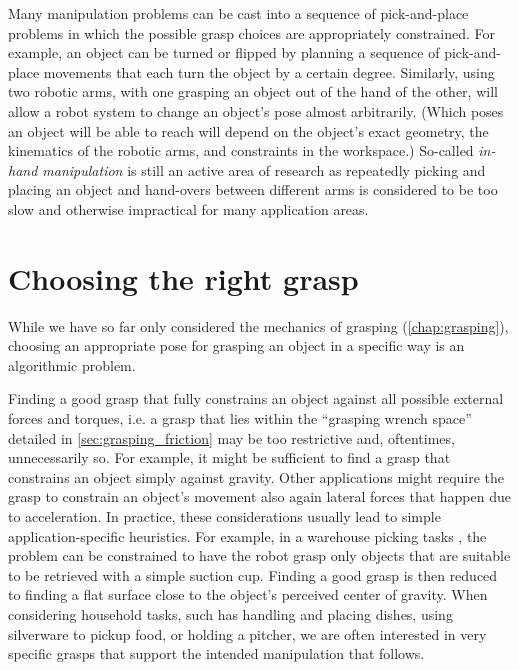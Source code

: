 Many manipulation problems can be cast into a sequence of pick-and-place problems in which the possible grasp choices are appropriately constrained. For example, an object can be turned or flipped by planning a sequence of pick-and-place movements that each turn the object by a certain degree. Similarly, using two robotic arms, with one grasping an object out of the hand of the other, will allow a robot system to change an object's pose almost arbitrarily. (Which poses an object will be able to reach will depend on the object's exact geometry, the kinematics of the robotic arms, and constraints in the workspace.) So-called \textsl{in-hand manipulation} is still an active area of research as repeatedly picking and placing an object and hand-overs between different arms is considered to be too slow and otherwise impractical for many application areas.


\section{Choosing the right grasp}
While we have so far only considered the mechanics of grasping (\cref{chap:grasping}), choosing an appropriate pose for grasping an object in a specific way is an algorithmic problem.

Finding a good grasp that fully constrains an object against all possible external forces and torques, i.e. a grasp that lies within the ``grasping wrench space'' detailed in \cref{sec:grasping_friction} may be too restrictive and, oftentimes, unnecessarily so.
For example, it might be sufficient to find a grasp that constrains an object simply against gravity.
Other applications might require the grasp to constrain an object's movement also again lateral forces that happen due to acceleration.
In practice, these considerations usually lead to simple application-specific heuristics. For example, in a warehouse picking tasks \cite{correll2016analysis}, the problem can be constrained to have the robot grasp only objects that are suitable to be retrieved with a simple suction cup. Finding a good grasp is then reduced to finding a flat surface close to the object's perceived center of gravity.
When considering household tasks, such has handling and placing dishes, using silverware to pickup food, or holding a pitcher, we are often interested in very specific grasps that support the intended manipulation that follows.

